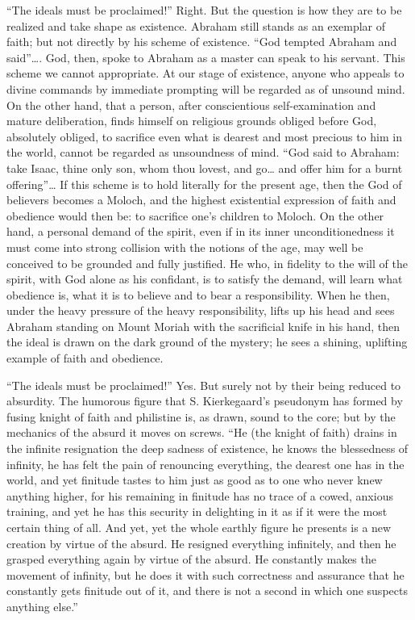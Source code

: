 \documentclass[12pt,a4paper,openany]{book}
\newcommand{\opage}[1]{\marginnote{\footnotesize\textit{[#1]}}}
\begin{document}
``The ideals must be proclaimed!'' Right. But the question is how they
are to be realized and take shape as existence. Abraham still stands as
an exemplar of faith; but not directly by his scheme of existence. ``God
tempted Abraham and said''\dots{}. God, then, spoke to Abraham as a master
can speak to his servant. This scheme we cannot appropriate. At our stage
of existence, anyone who appeals to divine commands by immediate
prompting will be regarded as of unsound mind. On the other hand, that a
person, after conscientious self-examination and mature deliberation,
finds himself on religious grounds obliged before God, absolutely
obliged, to sacrifice even what is dearest and most precious to him in
the world, cannot be regarded as unsoundness of mind. ``God said to
Abraham: take Isaac, thine only son, whom thou lovest, and go\dots{} and
offer him for a burnt offering''\dots{} If this scheme is to hold
literally for the present age, then the God of believers becomes a
Moloch, and the highest existential expression of faith and obedience
\opage{83}would then be: to sacrifice one's children to Moloch. On the other hand,
a personal demand of the spirit, even if in its inner unconditionedness
it must come into strong collision with the notions of the age, may well
be conceived to be grounded and fully justified. He who, in fidelity to
the will of the spirit, with God alone as his confidant, is to satisfy
the demand, will learn what obedience is, what it is to believe and to
bear a responsibility. When he then, under the heavy pressure of the
heavy responsibility, lifts up his head and sees Abraham standing on
Mount Moriah with the sacrificial knife in his hand, then the ideal is
drawn on the dark ground of the mystery; he sees a shining, uplifting
example of faith and obedience.

``The ideals must be proclaimed!'' Yes. But surely not by their being
reduced to absurdity. %
The humorous figure that S. Kierkegaard's pseudonym has formed by
fusing knight of faith and philistine is, as drawn, sound to the core;
but by the mechanics of the absurd it moves on screws. ``He (the knight
of faith) drains in the infinite resignation the deep sadness of
existence, he knows the blessedness of infinity, he has felt the pain of
renouncing everything, the dearest one has in the world, and yet
finitude tastes to him just as good as to one who never knew anything
higher, for his remaining in finitude has no trace of a cowed, anxious
training, and yet he has this security in delighting in it as if it were
the most certain thing of all. And yet, yet the whole earthly figure he
presents is a new creation by virtue of the absurd. He resigned
everything infinitely, and then he grasped everything again by virtue of
the absurd. He constantly makes the movement of infinity, but he \opage{84}does it
with such correctness and assurance that he constantly gets finitude out
of it, and there is not a second in which one suspects anything else.''
\end{document}

